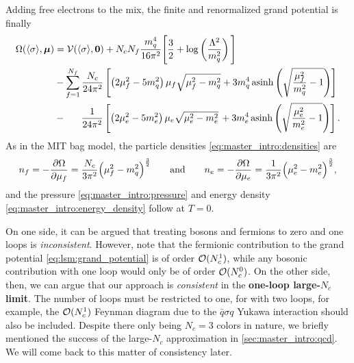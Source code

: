 Adding free electrons to the mix, the finite and renormalized grand potential is finally
\begin{equation}
\begin{split}
	\Omega(\langle \sigma \rangle,{\bm{\mu}}) &= \mathcal{V}(\langle \sigma \rangle,{\bm{0}}) + N_c N_f \frac{m_q^4}{16 \pi^2} \Bigg[ \frac{3}{2} + \log\left(\frac{{\Lambda}^2}{m_q^2}\right) \Bigg] \\
	                               &-\sum_{f=1}^{\smash{N_f}} \frac{N_c}{24 \pi^2} \left[ \left( 2 \mu_f^2 - 5 m_q^2 \right) \mu_f \sqrt{\mu_f^2 - m_q^2} + 3 m_q^4 \operatorname{asinh} \left( \sqrt{\frac{\mu_{\smash{f}}^2}{m_q^2}-1} \right) \right] \\
	                               &-\phantom{\sum} \, \frac{1}{24 \pi^2} \left[ \left( 2 \mu_e^2 - 5 m_e^2 \right) \mu_e \sqrt{\mu_e^2 - m_e^2} \, + 3 m_e^4 \operatorname{asinh} \left( \sqrt{\frac{\mu_{\smash{e}}^2}{m_e^2}-1} \right) \right].
\end{split}
\label{eq:lsm:grand_potential}
\end{equation}
As in the MIT bag model,
the particle densities \eqref{eq:master_intro:densities} are
\begin{equation}
	n_f = -\pdv{\Omega}{\mu_f} = \frac{N_c}{3 \pi^2} \Big( \mu_f^2 - m_q^2 \Big)^{\frac32}
	\qquad \text{and} \qquad
	n_e = -\pdv{\Omega}{\mu_e} = \frac{  1}{3 \pi^2} \Big( \mu_e^2 - m_e^2 \Big)^{\frac32},
\label{eq:lsm:particle_densities}%
\end{equation}%
and the pressure \eqref{eq:master_intro:pressure} and energy density \eqref{eq:master_intro:energy_density} follow at $T=0$.

On one side, it can be argued that treating bosons and fermions to zero and one loops is \emph{inconsistent}.
However, note that the fermionic contribution to the grand potential \eqref{eq:lsm:grand_potential} is of order $\mathcal{O}(N_c^1)$,
while any bosonic contribution with one loop would only be of order $\mathcal{O}(N_c^0)$.
On the other side, then, we can argue that our approach is \emph{consistent} in the \textbf{one-loop large-$N_c$ limit}.
The number of loops must be restricted to one, for with two loops, for example,
the $\mathcal{O}(N_c^1)$ Feynman diagram due to the $\bar{q} \sigma q$ Yukawa interaction should also be included.
Despite there only being $N_c=3$ colors in nature,
we briefly mentioned the success of the large-$N_c$ approximation in \cref{sec:master_intro:qcd}.
We will come back to this matter of consistency later.

